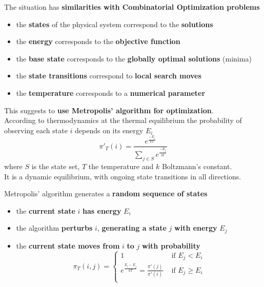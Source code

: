 The situation has \textbf{similarities with Combinatorial Optimization problems}
\begin{itemize}
	\item the \textbf{states} of the physical system correspond to the \textbf{solutions}
	
	\item the \textbf{energy} corresponds to the \textbf{objective function}
	
	\item the \textbf{base state} corresponds to the \textbf{globally optimal solutions} (minima)
	
	\item the \textbf{state transitions} correspond to \textbf{local search moves}
	
	\item the \textbf{temperature} corresponds to a \textbf{numerical parameter}
\end{itemize}

This suggests to \textbf{use Metropolis' algorithm for optimization}.\\

According to thermodynamics at the thermal equilibrium the probability of observing each state $i$ depends on its energy $E_i$
$$ \pi'_T (i) = \frac{e^{\frac{-E_i}{k T}}}{\sum_{j \in S} e^{\frac{-E_j}{k t}}}  $$
where $S$ is the state set, $T$ the temperature and $k$ Boltzmann's constant.\\

It is a dynamic equilibrium, with ongoing state transitions in all directions.\\

\newpage

Metropolis' algorithm generates a \textbf{random sequence of states}
\begin{itemize}
	\item the \textbf{current state} $i$ \textbf{has energy} $E_i$
	
	\item the algorithm \textbf{perturbs} $i$, \textbf{generating a state} $j$ \textbf{with energy} $E_j$
	
	\item the \textbf{current state moves from} $i$ \textbf{to} $j$ \textbf{with probability}
	$$ \pi_T (i,j) = \begin{cases}
		1 & \text{ if } E_j < E_i \\
		e^{\frac{E_i - E_j}{k T}} = \frac{\pi' (j)}{\pi' (i)} & \text{ if } E_j \geq E_i \\
	\end{cases} $$
\end{itemize}

